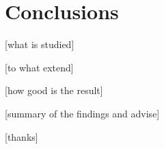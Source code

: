 \chapter{Conclusions}

 [what is studied]

 [to what extend]

 [how good is the result]

 [summary of the findings and advise]

 [thanks]